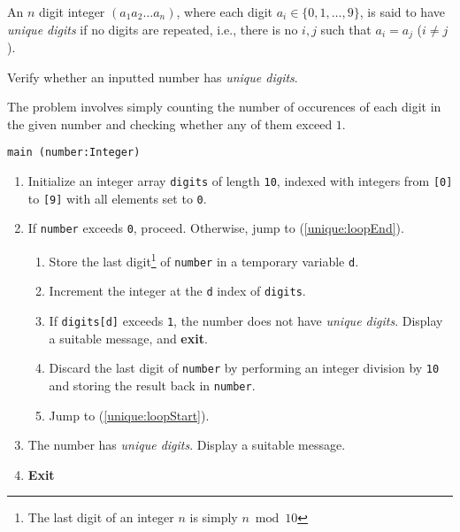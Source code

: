 

\problem An $n$ digit integer $(a_1a_2\dots a_n)$, where each digit $a_i \in \{0, 1, \dots, 9\}$,
is said to have {\em unique digits} if no digits are repeated, i.e., there is no $i, j$ such that $a_i = a_j$ ($i \neq j$).

Verify whether an inputted number has {\em unique digits}.

\solution The problem involves simply counting the number of occurences of each digit in the given number and checking whether any of them exceed $1$.

\algorithm
{\tt main (number:Integer)}
\begin{enumerate}
	\item	Initialize an integer array {\tt digits} of length {\tt 10}, indexed with integers
			from {\tt [0]} to {\tt [9]} with all elements set to {\tt 0}.
	\item	If {\tt number} exceeds {\tt 0}, proceed.
			Otherwise, jump to (\ref{unique:loopEnd}). \label{unique:loopStart}
	\begin{enumerate}
		\item	Store the last digit\footnote{The last digit of an integer $n$ is simply $n \bmod 10$}
				of {\tt number} in a temporary variable {\tt d}.
		\item	Increment the integer at the {\tt d} index of {\tt digits}.
		\item	If {\tt digits[d]} exceeds {\tt 1}, the number does not have {\em unique digits}. Display a suitable
				message, and {\bf exit}.
		\item	Discard the last digit of {\tt number} by performing an integer division by {\tt 10} and storing
				the result back in {\tt number}.
		\item	Jump to (\ref{unique:loopStart}).
	\end{enumerate}
	\item	The number has {\em unique digits}. Display a suitable message. \label{unique:loopEnd}
	\item	{\bf Exit}
\end{enumerate}

\sourcecode


